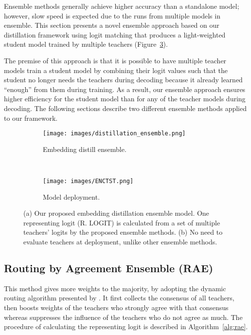 \documentclass{article}
\begin{document}
Ensemble methods generally achieve higher accuracy than a standalone model; however, slow speed is expected due to the runs from multiple models in ensemble.
This section presents a novel ensemble approach based on our distillation framework using logit matching that produces a light-weighted student model trained by multiple teachers (Figure~\ref{fig:distill-ensemble}).

The premise of this approach is that it is possible to have multiple teacher models train a student model by combining their logit values such that the student no longer needs the teachers during decoding because it already learned ``enough'' from them during training.
As a result, our ensemble approach ensures higher efficiency for the student model than for any of the teacher models during decoding.
The following sections describe two different ensemble methods applied to our framework.


\vspace{-1ex}
\begin{figure}[htbp!]
	\centering
	\begin{subfigure}[b]{0.25\textwidth}
		\centering
\texttt{[image: images/distillation\_ensemble.png]}
		\caption{Embedding distill ensemble.}
		\label{fig:distill-ensemble}
	\end{subfigure}~ 
	\begin{subfigure}[b]{0.23\textwidth}
		\centering
\texttt{[image: images/ENCTST.png]}
		\caption{Model deployment.}
		\label{fig:distill-ensemble-deploy}
	\end{subfigure}\caption{(a) Our proposed embedding distillation ensemble model. One representing logit (R. LOGIT) is calculated from a set of multiple teachers' logits by the proposed ensemble methods.
		(b) No need to evaluate teachers at deployment, unlike other ensemble methods.}
	\label{fig:distill-ensemble}
	\vspace{-4ex}
\end{figure}










\subsection{Routing by Agreement Ensemble (RAE)}
\label{sssec:rae-ensemble}

This method gives more weights to the majority, by adopting the dynamic routing algorithm presented by \cite{sabour2017dynamic}.
It first collects the consensus of all teachers, then boosts weights of the teachers who strongly agree with that consensus
whereas suppresses the influence of the teachers who do not agree as much.
The procedure of calculating the representing logit is described in Algorithm~\ref{alg:rae}.
\end{document}
